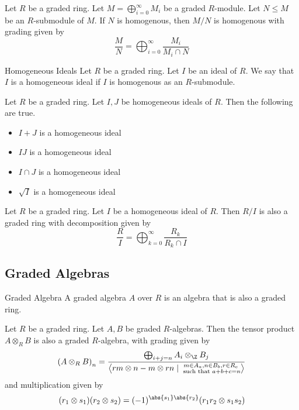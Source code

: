 \documentclass[a4paper]{article}
\begin{document}
\begin{prp}{}{} Let $R$ be a graded ring. Let $M=\bigoplus_{i=0}^\infty M_i$ be a graded $R$-module. Let $N\leq M$ be an $R$-submodule of $M$. If $N$ is homogenous, then $M/N$ is homogenous with grading given by $$\frac{M}{N}=\bigoplus_{i=0}^\infty\frac{M_i}{M_i\cap N}$$
\end{prp}

\begin{defn}{Homogeneous Ideals}{} Let $R$ be a graded ring. Let $I$ be an ideal of $R$. We say that $I$ is a homogeneous ideal if $I$ is homogenous as an $R$-submodule. 
\end{defn}

\begin{lmm}{}{} Let $R$ be a graded ring. Let $I,J$ be homogeneous ideals of $R$. Then the following are true. 
\begin{itemize}
\item $I+J$ is a homogeneous ideal
\item $IJ$ is a homogeneous ideal
\item $I\cap J$ is a homogeneous ideal
\item $\sqrt{I}$ is a homogeneous ideal
\end{itemize}
\end{lmm}

\begin{prp}{}{} Let $R$ be a graded ring. Let $I$ be a homogeneous ideal of $R$. Then $R/I$ is also a graded ring with decomposition given by $$\frac{R}{I}=\bigoplus_{k=0}^\infty\frac{R_k}{R_k\cap I}$$
\end{prp}

\subsection{Graded Algebras}
\begin{defn}{Graded Algebra}{} A graded algebra $A$ over $R$ is an algebra that is also a graded ring. 
\end{defn}

\begin{prp}{}{} Let $R$ be a graded ring. Let $A,B$ be graded $R$-algebras. Then the tensor product $A\otimes_RB$ is also a graded $R$-algebra, with grading given by $$\left(A\otimes_RB\right)_n=\frac{\bigoplus_{i+j=n}A_i\otimes_\Z B_j}{\left\langle rm\otimes n-m\otimes rn\;|\;\substack{m\in A_a, n\in B_b, r\in R_c\\\text{ such that }a+b+c=n}\right\rangle}$$ and multiplication given by $$(r_1\otimes s_1)(r_2\otimes s_2)=(-1)^{\abs{s_1}\abs{r_2}}(r_1r_2\otimes s_1s_2)$$
\end{prp}
\end{document}
